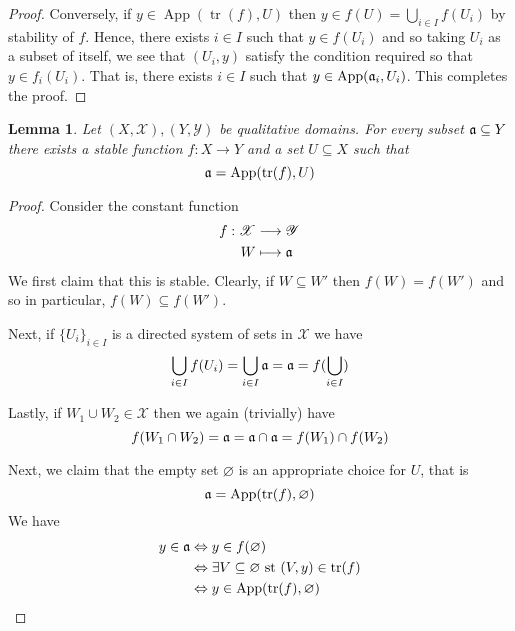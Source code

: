 \documentclass[12pt]{article}
\theoremstyle{plain}
\newtheorem{lemma}[thm]{Lemma}
\theoremstyle{definition}
\newcommand{\scr}[1]{\mathscr{#1}}
\newcommand{\lto}{\longrightarrow}
\begin{document}
\begin{proof}
		Conversely, if $y \in \operatorname{App}(\operatorname{tr}(f), U)$ then $y \in f(U) = \bigcup_{i \in I}f(U_i)$ by stability of $f$. Hence, there exists $i \in I$ such that $y \in f(U_i)$ and so taking $U_i$ as a subset of itself, we see that $(U_i, y)$ satisfy the condition required so that $y \in f_i(U_i)$. That is, there exists $i \in I$ such that $y \in \operatorname{App}(\frak{a}_i, U_i)$. This completes the proof.
		\end{proof}
	
	\begin{lemma}
		Let $(X, \scr{X}), (Y, \scr{Y})$ be qualitative domains. For every subset $\frak{a} \subseteq Y$ there exists a stable function $f: X \lto Y$ and a set $U \subseteq X$ such that
		\begin{equation}
			\frak{a} = \operatorname{App}(\operatorname{tr}(f), U)
			\end{equation}
		\end{lemma}
	\begin{proof}
		Consider the constant function
		\begin{align*}
			f: \scr{X} &\lto \scr{Y}\\
			W &\longmapsto \frak{a}
			\end{align*}
		We first claim that this is stable. Clearly, if $W \subseteq W'$ then $f(W) = f(W')$ and so in particular, $f(W) \subseteq f(W')$.
		
		Next, if $\{ U_i \}_{i \in I}$ is a directed system of sets in $\scr{X}$ we have
		\begin{equation}
			\bigcup_{i \in I}f(U_i) = \bigcup_{i \in I}\frak{a} = \frak{a}  = f(\bigcup_{i \in I})
			\end{equation}
		
		Lastly, if $W_1 \cup W_2 \in \scr{X}$ then we again (trivially) have
		\begin{equation}
			f(W_1 \cap W_2) = \frak{a} = \frak{a}\cap \frak{a} = f(W_1) \cap f(W_2)
			\end{equation}
		
		Next, we claim that the empty set $\varnothing$ is an appropriate choice for $U$, that is
		\begin{equation}
			\frak{a} = \operatorname{App}(\operatorname{tr}(f), \varnothing)
			\end{equation}
		We have
		\begin{align*}
			y \in \frak{a} &\Leftrightarrow y \in f(\varnothing)\\
			&\Leftrightarrow \exists V \subseteq \varnothing\text{ st }(V,y) \in \operatorname{tr}(f)\\
			&\Leftrightarrow y \in \operatorname{App}(\operatorname{tr}(f), \varnothing)
			\end{align*}
		\end{proof}
	
\end{document}
